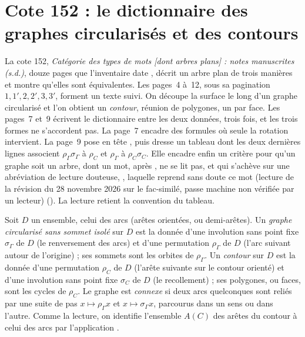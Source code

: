 \section[Cote 152 : le dictionnaire des graphes circularisés et des contours]{Cote 152 : le dictionnaire des graphes circularisés et des contours\protect{}}\label{sec:152}

La cote 152, \emph{Catégorie des types de mots [dont arbres plans] : notes manuscrites (s.d.)}, douze pages que l'inventaire date \q{[à partir de 1982]}, décrit un arbre plan de trois manières et montre qu'elles sont équivalentes. Les pages~4 à~12, sous sa pagination $1, 1', 2, 2', 3, 3'$, forment un texte suivi. On découpe la surface le long d'un graphe circularisé et l'on obtient un \emph{contour}, réunion de polygones, un par face. Les pages~7 et~9 écrivent le dictionnaire entre les deux données, trois fois, et les trois formes ne s'accordent pas. La page~7 encadre des formules où seule la rotation intervient. La page~9 pose en tête , puis dresse un tableau dont les deux dernières lignes associent $\rho_\Gamma \sigma_\Gamma$ à $\rho_C$ et $\rho_\Gamma$ à $\rho_C \sigma_C$. Elle encadre enfin un critère pour qu'un graphe soit un arbre, dont un mot, après , ne se lit pas, et qui s'achève sur une abréviation de lecture douteuse, , laquelle reprend sans doute ce mot (lecture de la révision du 28 novembre 2026 sur le fac-similé, passe machine non vérifiée par un lecteur) (). La lecture retient la convention du tableau.

\begin{definition}
Soit $D$ un ensemble, celui des arcs (arêtes orientées, ou demi-arêtes). Un \emph{graphe circularisé sans sommet isolé} sur $D$ est la donnée d'une involution sans point fixe $\sigma_\Gamma$ de $D$ (le renversement des arcs) et d'une permutation $\rho_\Gamma$ de $D$ (l'arc suivant autour de l'origine) ; ses sommets sont les orbites de $\rho_\Gamma$. Un \emph{contour} sur $D$ est la donnée d'une permutation $\rho_C$ de $D$ (l'arête suivante sur le contour orienté) et d'une involution sans point fixe $\sigma_C$ de $D$ (le recollement) ; ses polygones, ou faces, sont les cycles de $\rho_C$. Le graphe est \emph{connexe} si deux arcs quelconques sont reliés par une suite de pas $x \mapsto \rho_\Gamma x$ et $x \mapsto \sigma_\Gamma x$, parcourus dans un sens ou dans l'autre. Comme la lecture, on identifie l'ensemble $A(C)$ des arêtes du contour à celui des arcs par l'application .
\end{definition}

